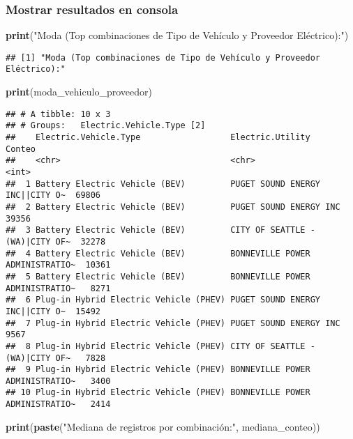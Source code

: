 \documentclass[
]{article}
\newenvironment{Shaded}{\begin{snugshade}}{\end{snugshade}}
\newcommand{\FunctionTok}[1]{\textcolor[rgb]{0.13,0.29,0.53}{\textbf{#1}}}
\newcommand{\NormalTok}[1]{#1}
\newcommand{\StringTok}[1]{\textcolor[rgb]{0.31,0.60,0.02}{#1}}
\begin{document}
\subsubsection{Mostrar resultados en
consola}\label{mostrar-resultados-en-consola}

\begin{Shaded}
\begin{Highlighting}[]
\FunctionTok{print}\NormalTok{(}\StringTok{"Moda (Top combinaciones de Tipo de Vehículo y Proveedor Eléctrico):"}\NormalTok{)}
\end{Highlighting}
\end{Shaded}

\begin{verbatim}
## [1] "Moda (Top combinaciones de Tipo de Vehículo y Proveedor Eléctrico):"
\end{verbatim}

\begin{Shaded}
\begin{Highlighting}[]
\FunctionTok{print}\NormalTok{(moda\_vehiculo\_proveedor)}
\end{Highlighting}
\end{Shaded}

\begin{verbatim}
## # A tibble: 10 x 3
## # Groups:   Electric.Vehicle.Type [2]
##    Electric.Vehicle.Type                  Electric.Utility                Conteo
##    <chr>                                  <chr>                            <int>
##  1 Battery Electric Vehicle (BEV)         PUGET SOUND ENERGY INC||CITY O~  69806
##  2 Battery Electric Vehicle (BEV)         PUGET SOUND ENERGY INC           39356
##  3 Battery Electric Vehicle (BEV)         CITY OF SEATTLE - (WA)|CITY OF~  32278
##  4 Battery Electric Vehicle (BEV)         BONNEVILLE POWER ADMINISTRATIO~  10361
##  5 Battery Electric Vehicle (BEV)         BONNEVILLE POWER ADMINISTRATIO~   8271
##  6 Plug-in Hybrid Electric Vehicle (PHEV) PUGET SOUND ENERGY INC||CITY O~  15492
##  7 Plug-in Hybrid Electric Vehicle (PHEV) PUGET SOUND ENERGY INC            9567
##  8 Plug-in Hybrid Electric Vehicle (PHEV) CITY OF SEATTLE - (WA)|CITY OF~   7828
##  9 Plug-in Hybrid Electric Vehicle (PHEV) BONNEVILLE POWER ADMINISTRATIO~   3400
## 10 Plug-in Hybrid Electric Vehicle (PHEV) BONNEVILLE POWER ADMINISTRATIO~   2414
\end{verbatim}

\begin{Shaded}
\begin{Highlighting}[]
\FunctionTok{print}\NormalTok{(}\FunctionTok{paste}\NormalTok{(}\StringTok{"Mediana de registros por combinación:"}\NormalTok{, mediana\_conteo))}
\end{Highlighting}
\end{Shaded}
\end{document}
